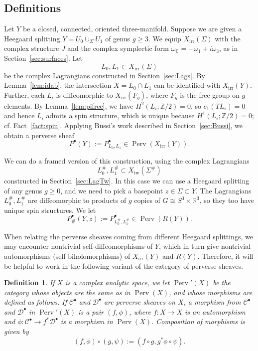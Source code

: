 \documentclass [11pt]{amsart}
\newtheorem {definition}[theorem]{Definition}
\theoremstyle{remark}
\def\zz {{\mathbb{Z}}}
\def\rr {{\mathbb{R}}}
\def\cc {{\mathbb{C}}}
\def\C{\cc}
\def\R{\rr}
\def\Z {\zz}
\def\D{\mathcal{D}}
\def\Cat{\mathcal{C}}
\def\Rep {R}
\def\Char {X}
\def\CharIrr {\Char_{\operatorname{irr}}}
\def\Perv {\operatorname{Perv}}
\def\tw{\operatorname{tw}}
\def\omegac{\omega_{\C}}
\begin{document}
\subsection{Definitions}
Let $Y$ be a closed, connected, oriented three-manifold. Suppose we are given a Heegaard splitting $Y = U_0 \cup_{\Sigma} U_1$ of genus $g \geq 3$. We equip $\CharIrr(\Sigma)$ with the complex structure $J$ and the complex symplectic form $\omegac=-\omega_1 + i \omega_3$, as in Section~\ref{sec:surfaces}. Let $$L_0, L_1 \subset \CharIrr(\Sigma)$$ be the complex Lagrangians constructed in Section~\ref{sec:Lags}. By Lemma~\ref{lem:idab}, the intersection $X=L_0 \cap L_1$ can be identified with $\CharIrr(Y)$. Further, each $L_i$ is diffeomorphic to $\CharIrr(F_g)$, where $F_g$ is the free group on $g$ elements. By Lemma~\ref{lem:pifree}, we have $H^2(L_i; \Z/2)=0$, so $c_1(TL_i)=0$ and hence $L_i$ admits a spin structure, which is unique because $H^1(L_i; \Z/2) = 0$; cf. Fact~\ref{fact:spin}. Applying Bussi's work described in Section~\ref{sec:Bussi}, we obtain a perverse sheaf
$$P^{\bullet}(Y):=P^{\bullet}_{L_0, L_1} \in \Perv(\CharIrr(Y)).$$

We can do a framed version of this construction, using the complex Lagrangians $$L_0^{\#} , L_1^{\#} \subset  \Char_{\tw}(\Sigma^{\#})$$
constructed in Section~\ref{sec:LagTw}. In this case we can use a Heegaard splitting of any genus $g \geq 0$, and we need to pick a basepoint $z \in \Sigma \subset Y$. The Lagrangians $L_0^{\#} , L_1^{\#} $ are diffeomorphic to products of $g$ copies of $G \cong S^3 \times \R^3$, so they too have unique spin structures. We let
$$ P^{\bullet}_\#(Y,z):=P^{\bullet}_{L_0^\#, L_1^\#} \in \Perv(\Rep(Y)).$$

When relating the perverse sheaves coming from different Heegaard splittings, we may encounter nontrivial self-diffeomorphisms of $Y$, which in turn give nontrivial automorphisms (self-biholomorphisms) of $\CharIrr(Y)$ and $\Rep(Y)$. Therefore, it will be helpful to work in the following variant of the category of perverse sheaves.

\begin{definition}
\label{def:pervp}
If $X$ is a complex analytic space, we let $\Perv'(X)$ be the category whose objects are the same as in $\Perv(X)$, and whose morphisms are defined as follows. If $\Cat^\bullet$ and $\D^\bullet$ are perverse sheaves on $X$, a morphism from $\Cat^\bullet$ and $\D^\bullet$ in $\Perv'(X)$ is a pair $(f, \phi)$, where $f: X \to X$ is an automorphism and $\phi: \Cat^{\bullet} \to f^*\D^\bullet$ is a morphism in $\Perv(X)$. Composition of morphisms is given by
$$ (f, \phi) \circ (g, \psi) := (f \circ g, g^*\phi \circ \psi).$$
\end{definition}
\end{document}
